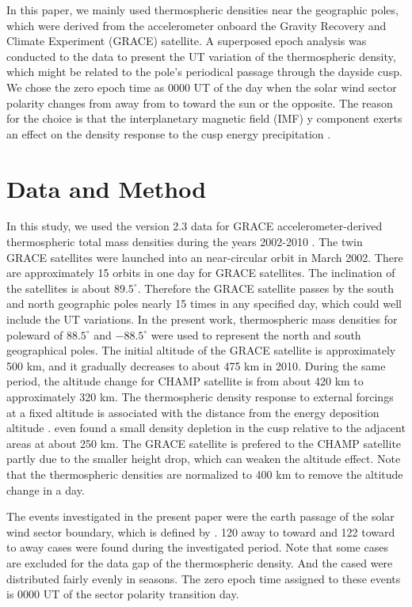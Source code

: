 \documentclass[draft,grl]{/home/gdj/文档/template/agu_template/AGUTeX}
\begin{document}
\begin{article}
    In this paper, we mainly used thermospheric densities near the geographic poles, which were derived from
    the accelerometer onboard the Gravity Recovery and Climate Experiment (GRACE) satellite. 
    A superposed epoch analysis was conducted to the data to present the UT variation of the thermospheric density,
    which might be related to the pole's periodical passage through the dayside cusp. 
    We chose the zero epoch time as 0000 UT of the day when the solar wind sector polarity changes from away from to 
    toward the sun or the opposite.
    The reason for the choice is that the interplanetary magnetic field (IMF) y component exerts an effect on the
    density response to the cusp energy precipitation \citep{Crowley2010, Knipp2011, Li2011}.

\section{Data and Method}
    In this study, we used the version 2.3 data for GRACE accelerometer-derived thermospheric total mass 
    densities during the years 2002-2010 \citep{Sutton2011}. 
    The twin GRACE satellites were launched into an near-circular orbit in March 2002.
    There are approximately 15 orbits in one day for GRACE satellites.
    The inclination of the satellites is about $89.5^\circ$.
    Therefore the GRACE satellite passes by the south and north geographic poles nearly 15 times in any specified day, 
    which could well include the UT variations.
    In the present work, thermospheric mass densities for poleward of $88.5^\circ$ and $-88.5^\circ$ were used to
    represent the north and south geographical poles.
    The initial altitude of the GRACE satellite is approximately 500 km, and it gradually decreases to about 475 km
    in 2010. 
    During the same period, the altitude change for CHAMP satellite is from about 420 km to approximately 320 km.
    The thermospheric density response to external forcings at a fixed altitude is associated with the 
    distance from the energy deposition altitude \citep{Lei2010a}.
    \citet{Clemmons2008} even found a small density depletion in the cusp relative to the adjacent areas at about 250 km.
    The GRACE satellite is prefered to the CHAMP satellite partly due to the smaller height drop, which can weaken the
    altitude effect.
    Note that the thermospheric densities are normalized to 400 km to remove the altitude change in a day.

    The events investigated in the present paper were the earth passage of the solar wind sector boundary, which is defined
    by \citet{Svalgaard1976}.
    120 away to toward and 122 toward to away cases were found during the investigated period. 
    Note that some cases are excluded for the data gap of the thermospheric density.
    And the cased were distributed fairly evenly in seasons.
    The zero epoch time assigned to these events is 0000 UT of the sector polarity transition day.




\end{article}
\end{document}
